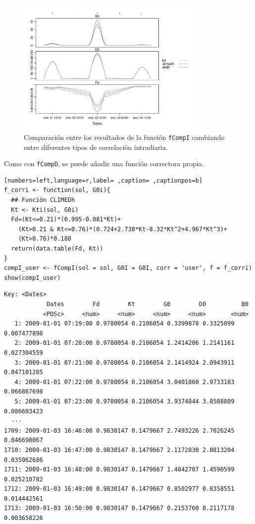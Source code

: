 \begin{itemize}
\begin{figure}[!htb]
\centering
\includegraphics[width=0.8\textwidth]{figuras/codigo-compicorr.pdf}
\caption{Comparación entre los resultados de la función \texttt{fCompI} cambiando entre diferentes tipos de correlación intradiaria.}
\end{figure}
\FloatBarrier
Como con \texttt{fCompD}, se puede añadir una función correctora propia.
\begin{lstlisting}[numbers=left,language=r,label= ,caption= ,captionpos=b]
f_corri <- function(sol, G0i){
  ## Función CLIMEDh
  Kt <- Kti(sol, G0i)
  Fd=(Kt<=0.21)*(0.995-0.081*Kt)+
    (Kt>0.21 & Kt<=0.76)*(0.724+2.738*Kt-8.32*Kt^2+4.967*Kt^3)+
    (Kt>0.76)*0.180
  return(data.table(Fd, Kt))
}
compI_user <- fCompI(sol = sol, G0I = G0I, corr = 'user', f = f_corri)
show(compI_user)
\end{lstlisting}

\begin{verbatim}
Key: <Dates>
		    Dates        Fd        Kt        G0        D0          B0
		   <POSc>     <num>     <num>     <num>     <num>       <num>
   1: 2009-01-01 07:19:00 0.9780054 0.2106054 0.3399878 0.3325099 0.007477898
   2: 2009-01-01 07:20:00 0.9780054 0.2106054 1.2414206 1.2141161 0.027304559
   3: 2009-01-01 07:21:00 0.9780054 0.2106054 2.1414924 2.0943911 0.047101285
   4: 2009-01-01 07:22:00 0.9780054 0.2106054 3.0401860 2.9733183 0.066867698
   5: 2009-01-01 07:23:00 0.9780054 0.2106054 3.9374844 3.8508809 0.086603423
  ---                                                                        
1709: 2009-01-03 16:46:00 0.9830147 0.1479667 2.7493226 2.7026245 0.046698067
1710: 2009-01-03 16:47:00 0.9830147 0.1479667 2.1172830 2.0813204 0.035962686
1711: 2009-01-03 16:48:00 0.9830147 0.1479667 1.4842707 1.4590599 0.025210782
1712: 2009-01-03 16:49:00 0.9830147 0.1479667 0.8502977 0.8358551 0.014442561
1713: 2009-01-03 16:50:00 0.9830147 0.1479667 0.2153760 0.2117178 0.003658226
\end{verbatim}


\end{itemize}
